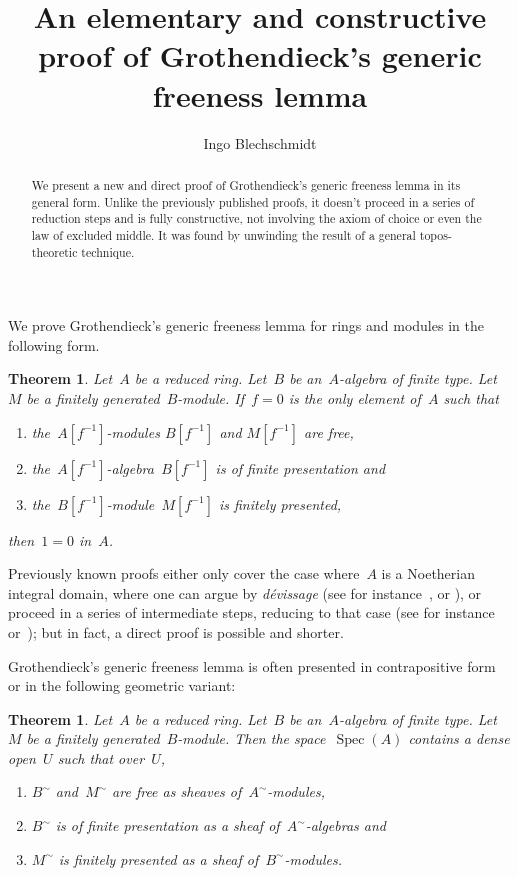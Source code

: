 \documentclass{amsart}
\title[Grothendieck's generic freeness lemma]{An elementary and constructive
proof of Grothendieck's generic freeness lemma}
\author{Ingo Blechschmidt}
\theoremstyle{definition}
\theoremstyle{plain}
\newtheorem{thm}[defn]{Theorem}
\theoremstyle{remark}
\DeclareMathOperator{\Spec}{Spec}
\newcommand{\stacksproject}[1]{\cite[{\href{https://stacks.math.columbia.edu/tag/#1}{Tag~#1}}]{stacks-project}}
\begin{document}
\begin{abstract}
  We present a new and direct proof of Grothendieck's generic freeness
  lemma in its general form. Unlike the previously published proofs, it doesn't
  proceed in a series of reduction steps and is fully constructive, not
  involving the axiom of choice or even the law of excluded middle. It was
  found by unwinding the result of a general topos-theoretic technique.
\end{abstract}

\maketitle
\thispagestyle{empty}

\noindent
We prove Grothendieck's generic freeness lemma for rings and modules in the
following form.

\begin{thm}\label{thm:algebraic}Let~$A$ be a reduced ring. Let~$B$ be
an~$A$-algebra of finite type. Let~$M$ be a finitely generated~$B$-module.
If~$f = 0$ is the only element of~$A$ such that
\begin{enumerate}
\item the~$A[f^{-1}]$-modules $B[f^{-1}]$ and $M[f^{-1}]$ are free,
\item the~$A[f^{-1}]$-algebra~$B[f^{-1}]$ is of finite presentation and
\item the~$B[f^{-1}]$-module~$M[f^{-1}]$ is finitely presented,
\end{enumerate}
then~$1 = 0$ in~$A$.
\end{thm}

Previously known proofs either only cover the case where~$A$ is a Noetherian
integral domain, where one can argue by \emph{dévissage} (see for
instance~\cite[Lemme~6.9.2]{ega-4-2},
\cite[Thm.~24.1]{matsumura:commutative-ring-theory} or
\cite[Thm.~14.4]{eisenbud:commutative-algebra}), or proceed in a series of
intermediate steps, reducing to that case (see for
instance~\cite{staats:generic-freeness} or~\stacksproject{051Q}); but in fact,
a direct proof is possible and shorter.

Grothendieck's generic freeness lemma is often presented in contrapositive form
or in the following geometric variant:

\begin{thm}\label{thm:geometric}Let~$A$ be a reduced ring. Let~$B$ be
an~$A$-algebra of finite type. Let~$M$ be a finitely generated~$B$-module. Then
the space~$\Spec(A)$ contains a dense open~$U$ such that over~$U$,
\begin{enumerate}
\item[(a)] $B^\sim$ and~$M^\sim$ are free as sheaves of~$A^\sim$-modules,
\item[(b)] $B^\sim$ is of finite presentation as a sheaf of~$A^\sim$-algebras and
\item[(c)] $M^\sim$ is finitely presented as a sheaf of~$B^\sim$-modules.
\end{enumerate}
\end{thm}
\end{document}
